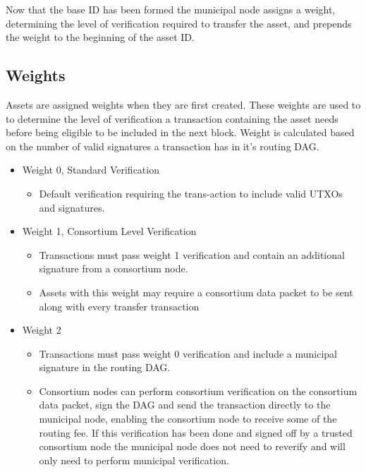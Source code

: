 \documentclass[12pt]{article}
\begin{document}



Now that the base ID has been formed the municipal node assigns 
a weight, determining the level of verification required to transfer 
the asset, and prepends the weight to the beginning of the asset ID.

\subsection{Weights}

Assets are assigned weights when they are first created. These weights are used to
to determine the level of verification a transaction containing the asset needs before
being eligible to be
included in the next block. Weight is calculated based on the number of valid signatures
a transaction has in it's routing DAG.


\begin{itemize}
	\item Weight 0, Standard Verification
		\begin{itemize}
			\item{Default verification requiring the trans-action to include
				valid UTXOs and signatures.}
		\end{itemize}
	\item Weight 1, Consortium Level Verification
		\begin{itemize}
			\item{Transactions must pass weight 1 verification and contain an
				additional signature from a consortium node.}
			\item{Assets with this weight may require a consortium data packet
				to be sent along with every transfer transaction}
		\end{itemize}
	\item Weight 2
		\begin{itemize}
			\item{Transactions must pass weight 0 verification and include a 
				municipal signature in the routing DAG.}
			\item{Consortium nodes can perform consortium verification on
				the consortium data packet, sign the DAG and send the
				transaction directly to the municipal node, enabling
				the consortium node to receive some of the routing fee.
				If this verification has been done and signed off by
				a trusted consortium node the municipal node does not
				need to reverify and will only need to
				perform municipal verification.}
		\end{itemize}
\end{itemize}
\end{document}
